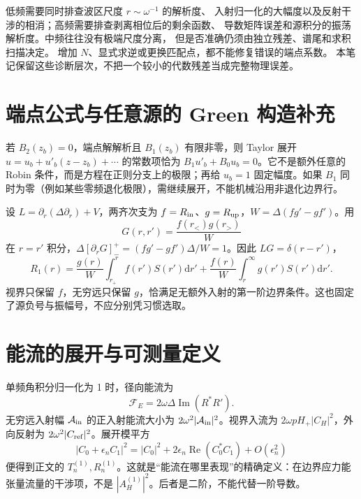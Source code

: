 \documentclass[UTF8,fontset=fandol,11pt,a4paper,oneside]{ctexart}
\numberwithin{equation}{section}
\newcommand{\dd}{\mathrm d}
\newcommand{\Ree}{\operatorname{Re}}
\newcommand{\Imm}{\operatorname{Im}}
\begin{document}
低频需要同时排查波区尺度 $r\sim\omega^{-1}$ 的解析度、
入射归一化的大幅度以及反射干涉的相消；高频需要排查剥离相位后的剩余函数、
导数矩阵误差和源积分的振荡解析度。中频往往没有极端尺度分离，
但是否准确仍须由独立残差、谱尾和求积扫描决定。
增加 $N$、显式求逆或更换匹配点，都不能修复错误的端点系数。
本笔记保留这些诊断层次，不把一个较小的代数残差当成完整物理误差。

\appendix

\section{端点公式与任意源的 Green 构造补充}
若 $B_2(z_b)=0$，端点解解析且 $B_1(z_b)$ 有限非零，则 Taylor 展开 $u=u_b+u'_b(z-z_b)+\cdots$ 的常数项恰为 $B_1u'_b+B_0u_b=0$。它不是额外任意的 Robin 条件，而是方程在正则分支上的极限；再给 $u_b=1$ 固定幅度。如果 $B_1$ 同时为零（例如某些零频退化极限），需继续展开，不能机械沿用非退化边界行。

设 $L=\partial_r(\Delta\partial_r)+V$，两齐次支为 $f=R_{\rm in}$、$g=R_{\rm up}$，$W=\Delta(fg'-gf')$。用
\begin{equation}
 G(r,r')=\frac{f(r_<)g(r_>)}{W}
\end{equation}
在 $r=r'$ 积分，$\Delta[\partial_rG]_-^+=(fg'-gf')\Delta/W=1$。因此 $LG=\delta(r-r')$，
\begin{equation}
 R_1(r)=\frac{g(r)}W\int_{r_+}^{r}f(r')S(r')\dd r'
 +\frac{f(r)}W\int_r^\infty g(r')S(r')\dd r'.
\end{equation}
视界只保留 $f$，无穷远只保留 $g$，恰满足无额外入射的第一阶边界条件。这也固定了源负号与振幅号，不应分别凭习惯选取。

\section{能流的展开与可测量定义}
单频角积分归一化为 1 时，径向能流为
\begin{equation}
 \mathcal F_E=2\omega\Delta\Imm(R^*R').
\end{equation}
无穷远入射幅 $\mathcal A_{\rm in}$ 的正入射能流大小为 $2\omega^2|\mathcal A_{\rm in}|^2$。视界入流为 $2\omega pH_+|C_H|^2$，外向反射为 $2\omega^2|C_{\rm ref}|^2$。展开模平方
\begin{equation}
 |C_0+\epsilon_n C_1|^2=|C_0|^2+
 2\epsilon_n\Ree(C_0^*C_1)+O(\epsilon_n^2)
\end{equation}
便得到正文的 $T_n^{(1)},R_n^{(1)}$。这就是“能流在哪里表现”的精确定义：在边界应力能张量流量的干涉项，不是 $|A_H^{(1)}|^2$。后者是二阶，不能代替一阶导数。
\end{document}

